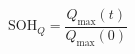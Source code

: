 \documentclass[preview]{standalone}
\begin{document}
\[\text{SOH}_Q = \frac{Q_\text{max}(t)}{Q_\text{max}(0)}\]
\end{document}
